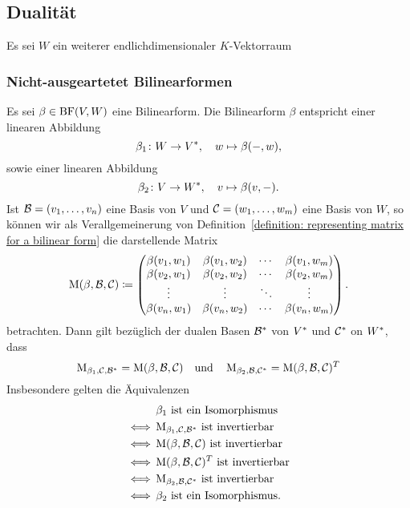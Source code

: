 \subsection{Dualität}

Es sei $W$ ein weiterer endlichdimensionaler $K$-Vektorraum



\subsubsection{Nicht-ausgeartetet Bilinearformen}

Es sei $\beta \in \operatorname{BF}(V, W)$ eine Bilinearform.
Die Bilinearform $\beta$ entspricht einer linearen Abbildung
\[
          \beta_1
  \colon  W
  \to     V^*,
  \quad
          w
  \mapsto \beta(-,w),
\]
sowie einer linearen Abbildung
\[
          \beta_2
  \colon  V
  \to     W^*,
  \quad
          v
  \mapsto \beta(v,-).
\]
Ist $\mathcal{B} = (v_1, \dotsc, v_n)$ eine Basis von $V$ und $\mathcal{C} = (w_1, \dotsc, w_m)$ eine Basis von $W$, so können wir als Verallgemeinerung von Definition~\ref{definition: representing matrix for a bilinear form} die darstellende Matrix
\[
            \operatorname{M}(\beta, \mathcal{B}, \mathcal{C})
  \coloneqq \begin{pmatrix}
              \beta(v_1, w_1) & \beta(v_1, w_2) & \cdots  & \beta(v_1, w_m) \\
              \beta(v_2, w_1) & \beta(v_2, w_2) & \cdots  & \beta(v_2, w_m) \\
              \vdots          & \vdots          & \ddots  & \vdots          \\
              \beta(v_n, w_1) & \beta(v_n, w_2) & \cdots  & \beta(v_n, w_m)
            \end{pmatrix}.
\]
betrachten.
Dann gilt bezüglich der dualen Basen $\mathcal{B}^*$ von $V^*$ und $\mathcal{C}^*$ on $W^*$, dass
\[
    \operatorname{M}_{\beta_1, \mathcal{C}, \mathcal{B}^*}
  = \operatorname{M}(\beta, \mathcal{B}, \mathcal{C})
  \quad\text{und}\quad
    \operatorname{M}_{\beta_2, \mathcal{B}, \mathcal{C}^*}
  = \operatorname{M}(\beta, \mathcal{B}, \mathcal{C}) ^T
\]
Insbesondere gelten die Äquivalenzen
\begin{align*}
      &\, \text{$\beta_1$ ist ein Isomorphismus}                                                \\
  \iff&\, \text{$\operatorname{M}_{\beta_1, \mathcal{C}, \mathcal{B}^*}$ ist invertierbar}         \\
  \iff&\, \text{$\operatorname{M}(\beta, \mathcal{B}, \mathcal{C})$ ist invertierbar}               \\
  \iff&\, \text{$\operatorname{M}(\beta, \mathcal{B}, \mathcal{C}) ^T$ ist invertierbar} \\
  \iff&\, \text{$\operatorname{M}_{\beta_2, \mathcal{B}, \mathcal{C}^*}$ ist invertierbar}         \\
  \iff&\, \text{$\beta_2$ ist ein Isomorphismus}.
\end{align*}

